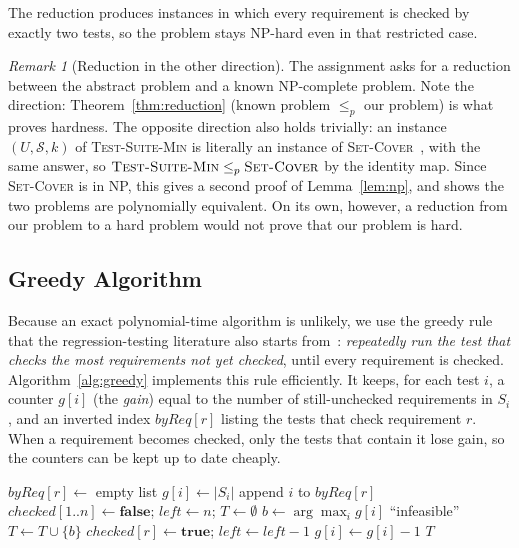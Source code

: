 \documentclass[conference]{IEEEtran}
\theoremstyle{definition}
\theoremstyle{remark}
\newtheorem{remark}{Remark}
\newcommand{\TSM}{\textsc{Test-Suite-Min}}
\newcommand{\SC}{\textsc{Set-Cover}}
\begin{document}
The reduction produces instances in which every requirement is checked by
exactly two tests, so the problem stays NP-hard even in that restricted case.

\begin{remark}[Reduction in the other direction]
The assignment asks for a reduction between the abstract problem and a known
NP-complete problem. Note the direction: Theorem~\ref{thm:reduction}
(known problem $\le_p$ our problem) is what proves hardness. The opposite
direction also holds trivially: an instance $(U,\mathcal{S},k)$ of \TSM{} is
literally an instance of \SC{}~\cite{karp1972}, with the same answer, so
$\TSM{} \le_p \SC{}$ by the identity map. Since \SC{} is in NP, this gives a
second proof of Lemma~\ref{lem:np}, and shows the two problems are
polynomially equivalent. On its own, however, a reduction from our problem to
a hard problem would not prove that our problem is hard.
\end{remark}

\subsection{Greedy Algorithm}
Because an exact polynomial-time algorithm is unlikely, we use the greedy rule
that the regression-testing literature also starts from~\cite{yoo2012}:
\emph{repeatedly run the test that checks the most requirements not yet
checked}, until every requirement is checked. Algorithm~\ref{alg:greedy}
implements this rule efficiently. It keeps, for each test $i$, a counter
$g[i]$ (the \emph{gain}) equal to the number of still-unchecked requirements in
$S_i$, and an inverted index $\mathit{byReq}[r]$ listing the tests that check
requirement $r$. When a requirement becomes checked, only the tests that
contain it lose gain, so the counters can be kept up to date cheaply.

\begin{algorithm}[t]
\caption{\textsc{GreedyMinimize}$(U, S_1,\dots,S_m)$}
\label{alg:greedy}
\begin{algorithmic}[1]
 $\mathit{byReq}[r] \gets$ empty list
\EndFor
{}
  \State $g[i] \gets |S_i|$
   append $i$ to $\mathit{byReq}[r]$
  \EndFor
\EndFor
\State $\mathit{checked}[1..n] \gets \textbf{false}$;\; $\mathit{left} \gets n$;\; $T \gets \emptyset$
  \State $b \gets \arg\max_{i} g[i]$ 
   \Return ``infeasible'' \EndIf
  \State $T \gets T \cup \{b\}$
    \State $\mathit{checked}[r] \gets \textbf{true}$;\; $\mathit{left} \gets \mathit{left} - 1$
     $g[i] \gets g[i] - 1$
    \EndFor
  \EndFor
\EndWhile
\State \Return $T$
\end{algorithmic}
\end{algorithm}
\end{document}
